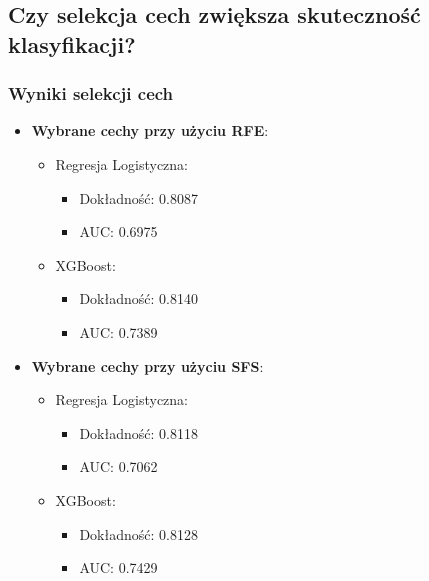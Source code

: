 \documentclass{article}
\begin{document}
\subsection{Czy selekcja cech zwiększa skuteczność klasyfikacji?}

\subsubsection{Wyniki selekcji cech}

\begin{itemize}
    \item \textbf{Wybrane cechy przy użyciu RFE}:
    \begin{itemize}
        \item Regresja Logistyczna:
        \begin{itemize}
            \item Dokładność: 0.8087
            \item AUC: 0.6975
        \end{itemize}
        \item XGBoost:
        \begin{itemize}
            \item Dokładność: 0.8140
            \item AUC: 0.7389
        \end{itemize}
    \end{itemize}
    \item \textbf{Wybrane cechy przy użyciu SFS}:
    \begin{itemize}
        \item Regresja Logistyczna:
        \begin{itemize}
            \item Dokładność: 0.8118
            \item AUC: 0.7062
        \end{itemize}
        \item XGBoost:
        \begin{itemize}
            \item Dokładność: 0.8128
            \item AUC: 0.7429
        \end{itemize}
    \end{itemize}
\end{itemize}
\end{document}
